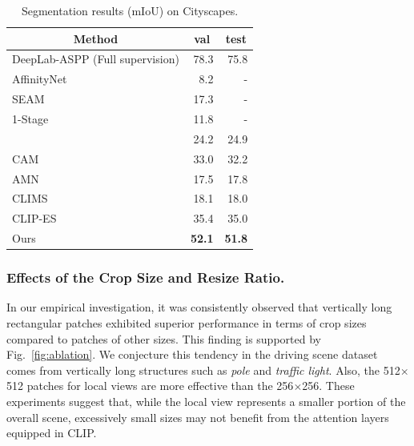 \documentclass[letterpaper]{article} %
\begin{document}
\begin{table}[]
\normalsize
\centering
{\small
\begin{tabular}{@{}lrr@{}}
\toprule
\multicolumn{1}{c}{Method}                              & \multicolumn{1}{c}{val} & \multicolumn{1}{c}{test} \\ \midrule
\multicolumn{1}{l}{DeepLab-ASPP (Full supervision)} & 78.3 & \multicolumn{1}{r}{75.8} \\ \midrule
\multicolumn{1}{l}{AffinityNet} &  8.2 & \multicolumn{1}{r}{-} \\
\multicolumn{1}{l}{SEAM} & 17.3 & \multicolumn{1}{r}{-} \\
\multicolumn{1}{l}{1-Stage} & 11.8 & \multicolumn{1}{r}{-} \\
\multicolumn{1}{l}{\citeauthor{wang2020deep}} & 24.2 & \multicolumn{1}{r}{24.9}          \\ 
\multicolumn{1}{l}{CAM} & 33.0 & \multicolumn{1}{r}{32.2} \\ 
\multicolumn{1}{l}{AMN} & 17.5 & \multicolumn{1}{r}{17.8} \\ 
\multicolumn{1}{l}{CLIMS } & 18.1 & \multicolumn{1}{r}{18.0} \\
\multicolumn{1}{l}{CLIP-ES } & 35.4 & \multicolumn{1}{r}{35.0} \\ \midrule
\multicolumn{1}{l}{Ours}                                & \textbf{52.1}     & \multicolumn{1}{r}{\textbf{51.8}} \\ \bottomrule

\end{tabular}
}
\caption{Segmentation results (mIoU) on Cityscapes.}
\label{tab:seg_cityscapes}
\end{table}

\subsubsection{Effects of the Crop Size and Resize Ratio.} In our empirical investigation, it was consistently observed that vertically long rectangular patches exhibited superior performance in terms of crop sizes compared to patches of other sizes. This finding is supported by Fig.~\ref{fig:ablation}. We conjecture this tendency in the driving scene dataset comes from vertically long structures such as \textit{pole} and \textit{traffic light}. Also, the 512$\times$512 patches for local views are more effective than the 256$\times$256. These experiments suggest that, while the local view represents a smaller portion of the overall scene, excessively small sizes may not benefit from the attention layers equipped in CLIP.
\end{document}
